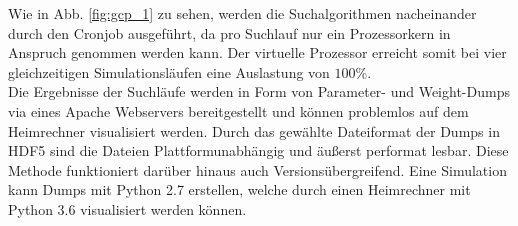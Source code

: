		Wie in Abb. \ref{fig:gcp_1} zu sehen, werden die Suchalgorithmen nacheinander durch den Cronjob ausgeführt, da pro Suchlauf nur ein Prozessorkern in Anspruch genommen werden kann. Der virtuelle Prozessor erreicht somit bei vier gleichzeitigen Simulationsläufen eine Auslastung von $100\%$.\\
		Die Ergebnisse der Suchläufe werden in Form von Parameter- und Weight-Dumps via eines Apache Webservers bereitgestellt und können problemlos auf dem Heimrechner visualisiert werden. Durch das gewählte Dateiformat der Dumps in HDF5 sind die Dateien Plattformunabhängig und äußerst performat lesbar. Diese Methode funktioniert darüber hinaus auch Versionsübergreifend. Eine Simulation kann Dumps mit Python 2.7 erstellen, welche durch einen Heimrechner mit Python 3.6 visualisiert werden können.

